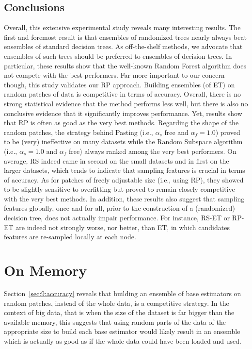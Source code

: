 \subsection{Conclusions}

Overall, this extensive experimental study reveals many interesting results. The
first and foremost result is that ensembles of randomized trees nearly always
beat ensembles of standard decision trees. As off-the-shelf methods, we advocate
that ensembles of such trees should be preferred to ensembles of decision trees.
In particular, these results show that the well-known Random Forest algorithm
does not compete with the best performers.  Far more important to our concern
though, this study validates our RP approach. Building ensembles (of ET) on
random patches of data is competitive in terms of accuracy. Overall, there is no
strong statistical evidence that the method performs less well, but there is
also no conclusive evidence that it significantly improves performance. Yet,
results show that RP is often as good as the very best methods. Regarding the
shape of the random patches, the strategy behind Pasting (i.e., $\alpha_s$ free and
$\alpha_f=1.0$) proved to be (very) ineffective on many datasets while the Random
Subspace algorithm (i.e., $\alpha_s=1.0$ and $\alpha_f$ free) always ranked among the very
best performers. On average, RS indeed came in second on the small datasets and
in first on the larger datasets, which tends to indicate that sampling features
is crucial in terms of accuracy. As for patches of freely adjustable size (i.e.,
using RP), they showed to be slightly sensitive to overfitting but proved to
remain closely competitive with the very best methods. In addition, these
results also suggest that sampling features globally, once and for all, prior to
the construction of a (randomized) decision tree, does not actually impair
performance. For instance, RS-ET or RP-ET are indeed not strongly worse, nor
better, than ET, in which candidates features are re-sampled locally at each
node.

\section{On Memory}
\label{sec:9:memory}

Section~\ref{sec:9:accuracy} reveals that building an ensemble of base
estimators on random patches, instead of the whole data, is a competitive
strategy. In the context of big data, that is when the size of the dataset is
far bigger than the available memory, this suggests that using  random
parts of the data of the appropriate size to build each base estimator would
likely result in an ensemble which is actually as good as if the whole data
could have been loaded and used.

